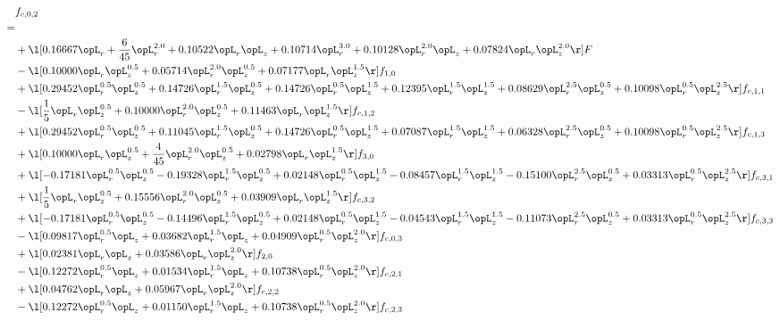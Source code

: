 \begin{alignat}{2} 
\label{eq:f_02_2} 
& f_{c,0,2} \nonumber \\ 
 = \\ 
& + \l[  0.16667 \opL_r + \frac{6}{45} \opL_r^{2.0} +  0.10522 \opL_r \opL_z +  0.10714 \opL_r^{3.0} +  0.10128 \opL_r^{2.0} \opL_z +  0.07824 \opL_r \opL_z^{2.0}  \r] F \nonumber \\ 
& - \l[  0.10000 \opL_r \opL_z^{0.5} +  0.05714 \opL_r^{2.0} \opL_z^{0.5} +  0.07177 \opL_r \opL_z^{1.5}  \r] f_{1,0} \nonumber \\ 
& + \l[  0.29452 \opL_r^{0.5} \opL_z^{0.5} +  0.14726 \opL_r^{1.5} \opL_z^{0.5} +  0.14726 \opL_r^{0.5} \opL_z^{1.5} +  0.12395 \opL_r^{1.5} \opL_z^{1.5} +  0.08629 \opL_r^{2.5} \opL_z^{0.5} +  0.10098 \opL_r^{0.5} \opL_z^{2.5}  \r] f_{c,1,1} \nonumber \\ 
& - \l[ \frac{1}{5} \opL_r \opL_z^{0.5} +  0.10000 \opL_r^{2.0} \opL_z^{0.5} +  0.11463 \opL_r \opL_z^{1.5}  \r] f_{c,1,2} \nonumber \\ 
& + \l[  0.29452 \opL_r^{0.5} \opL_z^{0.5} +  0.11045 \opL_r^{1.5} \opL_z^{0.5} +  0.14726 \opL_r^{0.5} \opL_z^{1.5} +  0.07087 \opL_r^{1.5} \opL_z^{1.5} +  0.06328 \opL_r^{2.5} \opL_z^{0.5} +  0.10098 \opL_r^{0.5} \opL_z^{2.5}  \r] f_{c,1,3} \nonumber \\ 
& + \l[  0.10000 \opL_r \opL_z^{0.5} + \frac{4}{45} \opL_r^{2.0} \opL_z^{0.5} +  0.02798 \opL_r \opL_z^{1.5}  \r] f_{3,0} \nonumber \\ 
& + \l[  -0.17181 \opL_r^{0.5} \opL_z^{0.5}   -0.19328 \opL_r^{1.5} \opL_z^{0.5} +  0.02148 \opL_r^{0.5} \opL_z^{1.5}   -0.08457 \opL_r^{1.5} \opL_z^{1.5}   -0.15100 \opL_r^{2.5} \opL_z^{0.5} +  0.03313 \opL_r^{0.5} \opL_z^{2.5}  \r] f_{c,3,1} \nonumber \\ 
& + \l[ \frac{1}{5} \opL_r \opL_z^{0.5} +  0.15556 \opL_r^{2.0} \opL_z^{0.5} +  0.03909 \opL_r \opL_z^{1.5}  \r] f_{c,3,2} \nonumber \\ 
& + \l[  -0.17181 \opL_r^{0.5} \opL_z^{0.5}   -0.14496 \opL_r^{1.5} \opL_z^{0.5} +  0.02148 \opL_r^{0.5} \opL_z^{1.5}   -0.04543 \opL_r^{1.5} \opL_z^{1.5}   -0.11073 \opL_r^{2.5} \opL_z^{0.5} +  0.03313 \opL_r^{0.5} \opL_z^{2.5}  \r] f_{c,3,3} \nonumber \\ 
& - \l[  0.09817 \opL_r^{0.5} \opL_z +  0.03682 \opL_r^{1.5} \opL_z +  0.04909 \opL_r^{0.5} \opL_z^{2.0}  \r] f_{c,0,3} \nonumber \\ 
& + \l[  0.02381 \opL_r \opL_z +  0.03586 \opL_r \opL_z^{2.0}  \r] f_{2,0} \nonumber \\ 
& - \l[  0.12272 \opL_r^{0.5} \opL_z +  0.01534 \opL_r^{1.5} \opL_z +  0.10738 \opL_r^{0.5} \opL_z^{2.0}  \r] f_{c,2,1} \nonumber \\ 
& + \l[  0.04762 \opL_r \opL_z +  0.05967 \opL_r \opL_z^{2.0}  \r] f_{c,2,2} \nonumber \\ 
& - \l[  0.12272 \opL_r^{0.5} \opL_z +  0.01150 \opL_r^{1.5} \opL_z +  0.10738 \opL_r^{0.5} \opL_z^{2.0}  \r] f_{c,2,3} \nonumber \\ 
\end{alignat} 


